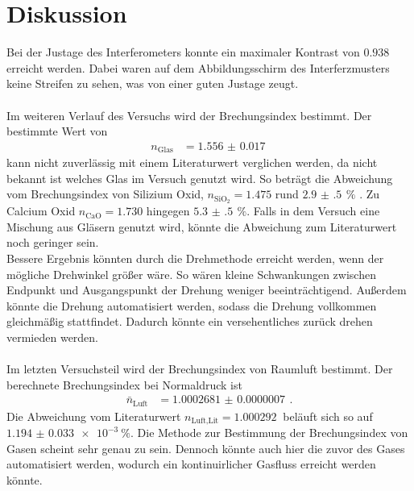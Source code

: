 \newpage
\section{Diskussion}
\label{sec:diskussion}
Bei der Justage des Interferometers konnte ein maximaler Kontrast von $0.938$ erreicht werden.
Dabei waren auf dem Abbildungsschirm des Interferzmusters keine Streifen zu sehen, was von einer guten Justage zeugt.\\\\
Im weiteren Verlauf des Versuchs wird der Brechungsindex bestimmt.
Der bestimmte Wert von 
\begin{align}
    n_\text{Glas} &= \SI{1.556(17)}{}
\end{align}
kann nicht zuverlässig mit einem Literaturwert verglichen werden, da nicht bekannt ist welches Glas im Versuch genutzt wird.
So beträgt die Abweichung vom Brechungsindex von Silizium Oxid, $n_{\text{SiO}_2} = 1.475$ rund $\SI{2.9(5)}{} \,\%$ \cite{Teschner2019}.
Zu Calcium Oxid $n_\text{CaO} = 1.730$ hingegen $\SI{5.3(5)}{}\,\%$.
Falls in dem Versuch eine Mischung aus Gläsern genutzt wird, könnte die Abweichung zum Literaturwert noch geringer sein.\\
Bessere Ergebnis könnten durch die Drehmethode erreicht werden, wenn der mögliche Drehwinkel größer wäre.
So wären kleine Schwankungen zwischen Endpunkt und Ausgangspunkt der Drehung weniger beeinträchtigend.
Außerdem könnte die Drehung automatisiert werden, sodass die Drehung vollkommen gleichmäßig stattfindet.
Dadurch könnte ein versehentliches zurück drehen vermieden werden.\\\\
Im letzten Versuchsteil wird der Brechungsindex von Raumluft bestimmt.
Der berechnete Brechungsindex bei Normaldruck ist
\begin{align*}
    \bar{n}_\text{Luft} &= \SI{1.0002681(07)}{}\,.
\end{align*}
Die Abweichung vom Literaturwert ${n_\text{Luft,Lit} = \SI{1.000292}{}}$ \cite{Dem2} beläuft sich so auf ${\SI{1.194(33)e-3}{\percent}}$.
Die Methode zur Bestimmung der Brechungsindex von Gasen scheint sehr genau zu sein.
Dennoch könnte auch hier die zuvor des Gases automatisiert werden, wodurch ein kontinuirlicher Gasfluss erreicht werden könnte.